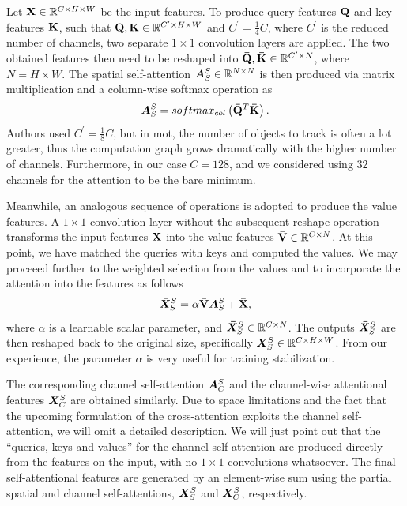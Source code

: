 Let $\mathbf{X} \in \mathbb{R}^{{C} \times {H} \times {W}}$ be the input features. To produce query features $\mathbf{Q}$ and key features $\mathbf{K}$, such that $\mathbf{Q}, \mathbf{K} \in \mathbb{R}^{{C^{\prime}} \times {H} \times {W}}$ and $C^{\prime} = \frac{1}{4}C$, where $C^{\prime}$ is the reduced number of channels, two separate $1 \times 1$ convolution layers are applied. The two obtained features then need to be reshaped into $\mathbf{\bar{Q}}, \mathbf{\bar{K}} \in \mathbb{R}^{{C^{\prime}} \times {N}}$, where $N = H \times W$. The spatial self-attention $\bm{A}_{S}^{S} \in \mathbb{R}^{{N} \times {N}}$ is then produced via matrix multiplication and a column-wise softmax operation as
\begin{equation}
    \label{eq:SpatialSelfAttention}
    \bm{A}_{S}^{S} =
    {softmax_{col}} \left( \mathbf{\bar{Q}}^T \mathbf{\bar{K}} \right).
\end{equation}
Authors used $C^{\prime} = \frac{1}{8}C$, but in \gls{mot}, the number of objects to track is often a lot greater, thus the computation graph grows dramatically with the higher number of channels. Furthermore, in our case $C = 128$, and we considered using $32$ channels for the attention to be the bare minimum.

Meanwhile, an analogous sequence of operations is adopted to produce the value features. A $1 \times 1$ convolution layer without the subsequent reshape operation transforms the input features $\mathbf{X}$ into the value features $\mathbf{\bar{V}} \in \mathbb{R}^{{C} \times {N}}$. At this point, we have matched the queries with keys and computed the values. We may proceeed further to the weighted selection from the values and to incorporate the attention into the features as follows
\begin{equation}
    \label{eq:SpatialSelfAttentionApplication}
    \bm{\bar{X}}_{S}^{S} =
    \alpha \mathbf{\bar{V}} \bm{A}_{S}^{S} + \mathbf{\bar{X}},
\end{equation}
where $\alpha$ is a learnable scalar parameter, and $\bm{\bar{X}}_{S}^{S} \in \mathbb{R}^{{C} \times {N}}$. The outputs $\bm{\bar{X}}_{S}^{S}$ are then reshaped back to the original size, specifically $\bm{X}_{S}^{S} \in \mathbb{R}^{{C} \times {H} \times {W}}$. From our experience, the parameter $\alpha$ is very useful for training stabilization.

The corresponding channel self-attention $\bm{A}_{C}^{S}$ and the channel-wise attentional features $\bm{X}_{C}^{S}$ are obtained similarly. Due to space limitations and the fact that the upcoming formulation of the cross-attention exploits the channel self-attention, we will omit a detailed description. We will just point out that the ``queries, keys and values'' for the channel self-attention are produced directly from the features on the input, with no $1 \times 1$ convolutions whatsoever. The final self-attentional features are generated by an element-wise sum using the partial spatial and channel self-attentions, $\bm{X}_{S}^{S}$ and $\bm{X}_{C}^{S}$, respectively.

